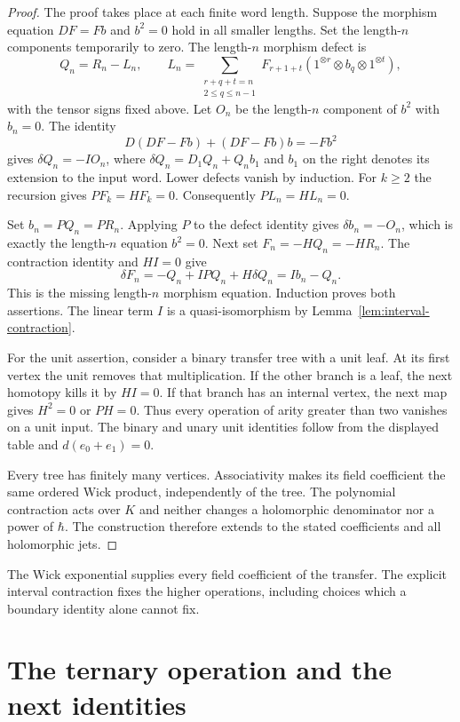 \begin{proof}
The proof takes place at each finite word length.  Suppose the
morphism equation $DF=Fb$ and $b^2=0$ hold in all smaller lengths.
Set the length-$n$ components temporarily to zero.  The length-$n$
morphism defect is
\[
 Q_n=R_n-L_n,\qquad
 L_n=\sum_{\substack{r+q+t=n\\2\le q\le n-1}}
 F_{r+1+t}(1^{\otimes r}\otimes b_q\otimes1^{\otimes t}),
\]
with the tensor signs fixed above.  Let $O_n$ be the length-$n$
component of $b^2$ with $b_n=0$.  The identity
\[
 D(DF-Fb)+(DF-Fb)b=-Fb^2
\]
gives $\delta Q_n=-I O_n$, where
$\delta Q_n=D_1Q_n+Q_n b_1$ and $b_1$ on the right denotes its
extension to the input word.  Lower defects vanish by induction.
For $k\ge2$ the recursion gives $PF_k=HF_k=0$.  Consequently
$PL_n=HL_n=0$.

Set $b_n=PQ_n=PR_n$.  Applying $P$ to the defect identity gives
$\delta b_n=-O_n$, which is exactly the length-$n$ equation $b^2=0$.
Next set $F_n=-HQ_n=-HR_n$.  The contraction identity and $HI=0$
give
\[
 \delta F_n=-Q_n+IPQ_n+H\delta Q_n=I b_n-Q_n.
\]
This is the missing length-$n$ morphism equation.  Induction proves
both assertions.  The linear term $I$ is a quasi-isomorphism by
Lemma~\ref{lem:interval-contraction}.

For the unit assertion, consider a binary transfer tree with a unit
leaf.  At its first vertex the unit removes that multiplication.
If the other branch is a leaf, the next homotopy kills it by $HI=0$.
If that branch has an internal vertex, the next map gives $H^2=0$
or $PH=0$.  Thus every operation of arity greater than two vanishes
on a unit input.  The binary and unary unit identities follow from
the displayed table and $d(e_0+e_1)=0$.

Every tree has finitely many vertices.  Associativity makes its field
coefficient the same ordered Wick product, independently of the tree.
The polynomial contraction acts over $K$ and neither changes a holomorphic denominator
nor a power of $\hbar$.  The construction therefore extends to the
stated coefficients and all holomorphic jets.
\end{proof}

The Wick exponential supplies every field coefficient of the transfer.
The explicit interval contraction fixes the higher operations,
including choices which a boundary identity alone cannot fix.

\section{The ternary operation and the next identities}

